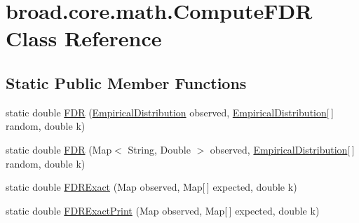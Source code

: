 \hypertarget{classbroad_1_1core_1_1math_1_1_compute_f_d_r}{\section{broad.\+core.\+math.\+Compute\+F\+D\+R Class Reference}
\label{classbroad_1_1core_1_1math_1_1_compute_f_d_r}
}
\subsection*{Static Public Member Functions}
\begin{DoxyCompactItemize}
\item 
static double \hyperlink{classbroad_1_1core_1_1math_1_1_compute_f_d_r_adc46dcf8c00a0261b41af58be08b35f8}{F\+D\+R} (\hyperlink{classbroad_1_1core_1_1math_1_1_empirical_distribution}{Empirical\+Distribution} observed, \hyperlink{classbroad_1_1core_1_1math_1_1_empirical_distribution}{Empirical\+Distribution}\mbox{[}$\,$\mbox{]} random, double k)
\item 
static double \hyperlink{classbroad_1_1core_1_1math_1_1_compute_f_d_r_a3c569de7e13aa507be0758f980700cf2}{F\+D\+R} (Map$<$ String, Double $>$ observed, \hyperlink{classbroad_1_1core_1_1math_1_1_empirical_distribution}{Empirical\+Distribution}\mbox{[}$\,$\mbox{]} random, double k)
\item 
static double \hyperlink{classbroad_1_1core_1_1math_1_1_compute_f_d_r_a6b8a9fa5064d01be737d6aab6ca02d38}{F\+D\+R\+Exact} (Map observed, Map\mbox{[}$\,$\mbox{]} expected, double k)
\item 
static double \hyperlink{classbroad_1_1core_1_1math_1_1_compute_f_d_r_abf078a69f215d6e59fadf45569409320}{F\+D\+R\+Exact\+Print} (Map observed, Map\mbox{[}$\,$\mbox{]} expected, double k)
\end{DoxyCompactItemize}


